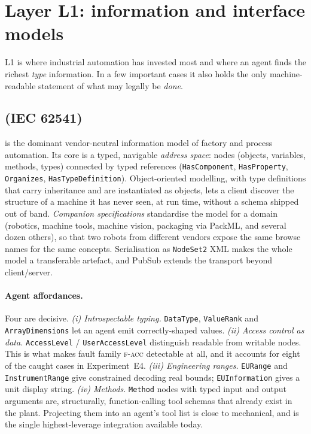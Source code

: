 \section{Layer L1: information and interface models}
\label{sec:layer1}

L1 is where industrial automation has invested most and where an agent finds the
richest \emph{type} information. In a few important cases it also holds the only
machine-readable statement of what may legally be \emph{done}.

\subsection{\opcua{} (IEC 62541)}

\opcua{} \cite{iec62541} is the dominant vendor-neutral information model of
factory and process automation. Its core is a typed, navigable \emph{address space}: nodes
(objects, variables, methods, types) connected by typed references
(\texttt{HasComponent}, \texttt{HasProperty}, \texttt{Organizes},
\texttt{HasTypeDefinition}). Object-oriented modelling, with type definitions
that carry inheritance and are instantiated as objects, lets a client discover
the structure of a machine it has never seen, at run time, without a schema
shipped out of band.
\emph{Companion specifications} standardise the model for a domain (robotics,
machine tools, machine vision, packaging via PackML, and several dozen others),
so that two robots from different vendors expose the same browse names for the
same concepts. Serialisation as \texttt{NodeSet2} XML makes the whole model a
transferable artefact, and PubSub extends the transport beyond client/server.

\paragraph{Agent affordances.} Four are decisive.
\emph{(i) Introspectable typing.} \texttt{DataType}, \texttt{ValueRank} and
\texttt{ArrayDimensions} let an agent emit correctly-shaped values.
\emph{(ii) Access control as data.} \texttt{AccessLevel} /
\texttt{UserAccessLevel} distinguish readable from writable nodes. This is
what makes fault family \textsc{f-acc} detectable at all, and it accounts for
eight of the caught cases in Experiment~E4.
\emph{(iii) Engineering ranges.} \texttt{EURange} and \texttt{InstrumentRange}
give constrained decoding real bounds; \texttt{EUInformation} gives a unit
display string.
\emph{(iv) Methods.} \opcua{} \texttt{Method} nodes with typed input and output
arguments are, structurally, function-calling tool schemas that already exist in
the plant. Projecting them into an agent's tool list is close to mechanical, and
is the single highest-leverage integration available today.

